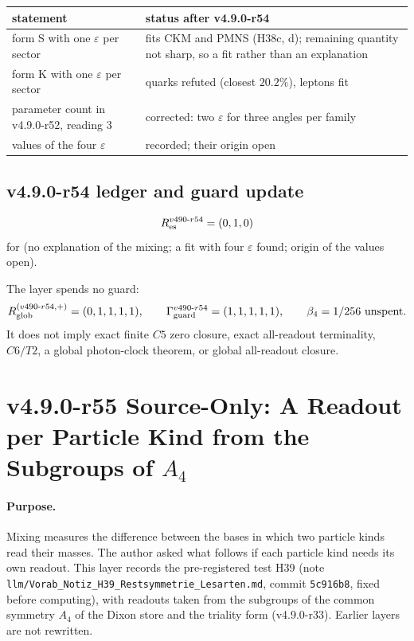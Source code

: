 \begin{center}
\small
\begin{tabular}{@{}>{\raggedright\arraybackslash}p{}>{\raggedright\arraybackslash}p{}@{}}
\toprule
statement & status after v4.9.0-r54\\
\midrule
form S with one \(\varepsilon\) per sector & fits CKM and PMNS (H38c, d); remaining quantity not sharp, so a fit rather than an explanation\\
form K with one \(\varepsilon\) per sector & quarks refuted (closest \(20.2\%\)), leptons fit\\
parameter count in v4.9.0-r52, reading 3 & corrected: two \(\varepsilon\) for three angles per family\\
values of the four \(\varepsilon\) & recorded; their origin open\\
\bottomrule
\end{tabular}
\end{center}

\subsection*{v4.9.0-r54 ledger and guard update}
\label{subsec:v490-r54-ledger-guard}

\[
R_{\rm es}^{v490\text{-}r54}=(0,1,0)
\]
for (no explanation of the mixing; a fit with four \(\varepsilon\) found; origin of the values open).

The layer spends no guard:
\[
R_{\rm glob}^{(v490\text{-}r54,+)}=(0,1,1,1,1),
\qquad
\Gamma_{\rm guard}^{v490\text{-}r54}=(1,1,1,1,1),
\qquad
\beta_4=1/256\ \text{unspent}.
\]
It does not imply exact finite \(C5\) zero closure, exact all-readout terminality,
\(C6/T2\), a global photon-clock theorem, or global all-readout closure.

\clearpage
\section*{v4.9.0-r55 Source-Only: A Readout per Particle Kind from the Subgroups of \texorpdfstring{\(A_4\)}{A4}}
\label{sec:v490-r55-residual-readouts}

\paragraph{Purpose.}
Mixing measures the difference between the bases in which two particle kinds read their masses.  The author asked what follows if each particle
kind needs its own readout.  This layer records the pre-registered test H39 (note \texttt{llm/Vorab\_Notiz\_H39\_Restsymmetrie\_Lesarten.md}, commit
\texttt{5c916b8}, fixed before computing), with readouts taken from the subgroups of the common symmetry \(A_4\) of the Dixon store and the triality
form (v4.9.0-r33).  Earlier layers are not rewritten.

